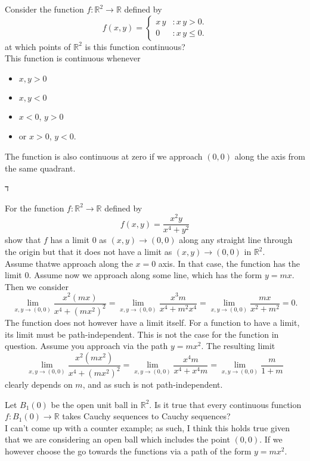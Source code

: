 \documentclass[12pt]{book}
\newcommand{\R}{\mathbb{R}}
\newenvironment{exercise}[2][Exercise]{\begin{trivlist}
\item[\hskip \labelsep {\bfseries #1}\hskip \labelsep {\bfseries #2.}]}{\end{trivlist}}
\begin{document}
\begin{exercise}{8.1.4}
Consider the function $f:\R^2  \to \R $ defined by  
    \[ f(x,y) = \left\{
     \begin{array}{lr}
       x \, y & : x \, y > 0.\\
       0 & : x \, y \leq 0.
     \end{array}
   \right. \]
   at which points of $\R^2$ is this function continuous? \\
   
   
    This function is continuous whenever
    \begin{itemize}
        \item $x,y >0$ 
        \item $x,y < 0$
        \item $x < 0$, $y > 0$
        \item or $x > 0$, $y < 0.$
    \end{itemize}
    The function is also continuous at zero if we approach $(0,0)$ along the axis from the same quadrant.
\end{exercise}
ד


\begin{exercise}{8.1.5}
For the function  $f : \R^2 \to \R$ defined by 
    \[ f(x,y) = \frac{x^2 y}{x^4 + y^2} \]
show that $f$ has a limit $0$ as $(x,y) \to (0,0)$ along any straight line through the origin but that it does not have a limit as $(x,y)\to (0,0)$ in $\R^2$. \\

Assume thatwe approach along the $x = 0$ axis. In that case, the function has the limit $0$. Assume now we approach along some line, which has the form $ y = m x$. Then we consider 
    \[ \lim_{x,y \to (0,0)} \frac{x^2  (mx)}{x^4 + (m x^2)^2} = \lim_{x,y \to (0,0)} \frac{x^3 m}{x^4 + m^2 x^4} = \lim_{x,y \to (0,0)} \frac{m x}{x^2 + m^2} = 0.\]
    The function does not however have a limit itself. For a function to have a limit, its limit must be path-independent. This is not the case for the function in question. Assume you approach via the path $y = m x^2$. The resulting limit
        \[ \lim_{x,y \to (0,0)} \frac{x^2 (mx^2)}{x^4 + (mx^2)^2} = \lim_{x,y \to (0,0)} \frac{x^4 m}{x^4 + x^4 m} = \lim_{x,y \to (0,0)} \frac{m}{1 + m}  \]
    clearly depends on $m$, and as such is not path-independent.
\end{exercise}



\begin{exercise}{8.1.12}
Let $B_1(0)$ be the open unit ball in $\R^2$. Is it true that every continuous function $f:B_1(0) \to \R$ takes Cauchy sequences to Cauchy sequences? \\

I can't come up with a counter example; as such, I think this holds true given that we are considering an open ball which includes the point $(0,0)$. If we however choose the go towards the functions via a path of the form $y = m x^2$.
\end{exercise}
\end{document}
